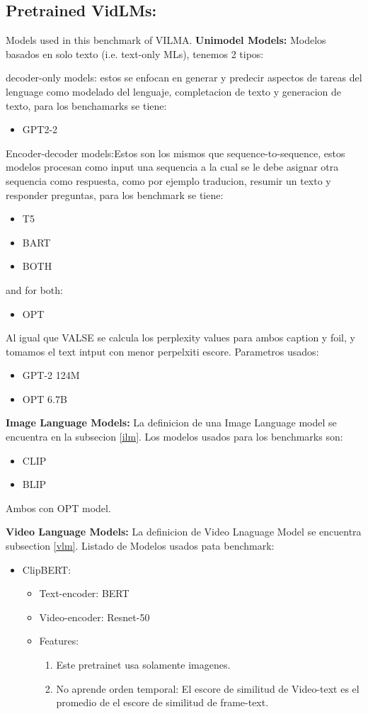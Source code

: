 \subsection{Pretrained VidLMs:}
Models used in this benchmark of VILMA.
\textbf{Unimodel Models:}
Modelos basados en solo texto (i.e. text-only MLs), tenemos 2 tipos:

decoder-only models: estos se enfocan en generar y predecir aspectos de tareas del lenguage como modelado del lenguaje, completacion de texto y generacion de texto, para los benchamarks se tiene:
\begin{itemize}
\item GPT2-2
\end{itemize}
Encoder-decoder models:Estos son los mismos que sequence-to-sequence, estos modelos procesan como input una sequencia a la cual se le debe asignar otra sequencia como respuesta, como por ejemplo traducion, resumir un texto y responder preguntas, para los benchmark se tiene:
\begin{itemize}
\item T5
\item BART
\item BOTH
\end{itemize}
and for both:
\begin{itemize}
\item OPT
\end{itemize}
Al igual que VALSE se calcula los perplexity values para ambos caption y foil, y tomamos el text intput con menor perpelxiti escore.
Parametros usados:
\begin{itemize}
\item GPT-2 124M
\item OPT 6.7B
\end{itemize}


\textbf{Image Language Models:}
La definicion de una Image Language model se encuentra en la subsecion \ref{ilm}.
Los modelos usados para los benchmarks son:
\begin{itemize}
\item CLIP
\item BLIP
\end{itemize}
Ambos con OPT model.
 
\textbf{Video Language Models:}
La definicion de Video Lnaguage Model se encuentra subsection \ref{vlm}.
Listado de Modelos usados pata benchmark:
\begin{itemize}
\item ClipBERT:
\begin{itemize}
\item Text-encoder: BERT
\item Video-encoder: Resnet-50
\item Features:
\begin{enumerate}
\item Este pretrainet usa solamente imagenes.
\item No aprende orden temporal: El escore de similitud de Video-text es el promedio de el escore de similitud de frame-text.
\end{enumerate}
\end{itemize}
\end{itemize}

